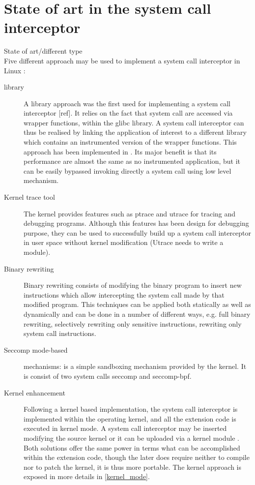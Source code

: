 \section{State of art in the system call interceptor}
State of art/different type \\  
Five different approach may be used to implement a system call interceptor in Linux :
\begin{description}

\item[library]	A library approach was the first used for implementing a system call interceptor [ref]. It relies on the fact that system call are accessed via  wrapper functions, within the glibc library. A system call interceptor can thus be realised by linking the application of interest to a different library which contains an instrumented version of the wrapper functions. This approach has been implemented in \cite{plashglibc}. Its major benefit is that its performance are almost the same as no instrumented application, but it can be easily bypassed invoking directly a system call using low level mechanism.  


\item[Kernel trace tool] The kernel provides features such as ptrace and utrace for tracing and debugging programs. Although this features has been design for debugging purpose, they can be used to successfully build up a system call interceptor in user space without kernel modification (Utrace needs to write a module). 

\item[Binary rewriting]  Binary rewriting consists of modifying the binary program to insert new instructions which allow intercepting the system call made by that modified program. This techniques can be applied both statically as well as dynamically and can be done in a number of different ways, e.g. full binary rewriting, selectively rewriting only sensitive instructions, rewriting only system call instructions.

\item[Seccomp mode-based] mechanisms: is a simple sandboxing mechanism provided by the kernel. It is consist of two system calls seccomp and seccomp-bpf.
 
\item[Kernel enhancement] Following a kernel based implementation, the system call interceptor is implemented within the operating kernel, and all the extension code is executed in kernel mode. A system call interceptor may be inserted modifying the source kernel \cite{Noordende_asecure} or it can be uploaded via a kernel module \cite{Janus}. Both solutions offer the same power in terms what can be accomplished within the extension code, though the later does require neither to compile nor to patch the kernel, it is thus more portable. The kernel approach is exposed in more details in \ref{kernel_mode}.
 



\end{description}

